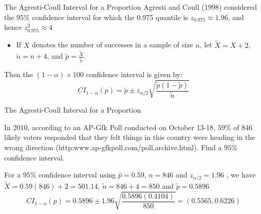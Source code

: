 \documentclass[
  ignorenonframetext,
]{beamer}
\providecommand{\tightlist}{%
  \setlength{\itemsep}{0pt}\setlength{\parskip}{0pt}}
\begin{document}
\begin{frame}{The Agresti-Coull Interval for a Proportion}
\protect\hypertarget{the-agresti-coull-interval-for-a-proportion}{}
Agresti and Coull (1998) considered the \(95\%\) confidence interval for
which the 0.975 quantile is \(z_{0.975}\approx1.96\), and hence
\(z^2_{0.975}\approx 4\)

\begin{itemize}
\tightlist
\item
  If \(X\) denotes the number of successes in a sample of size \(n\),
  let \(\tilde{X}=X+2\), \(\tilde{n}=n+4\), and
  \(\tilde{p}=\frac{\tilde{X}}{\tilde{n}}\).
\end{itemize}

Then the \((1-\alpha)\times 100\) confidence interval is given by:
\[CI_{1 - \alpha}(p) = \tilde{p}\pm z_{\alpha/2}\sqrt{\frac{\tilde{p}(1-\tilde{p})}{\tilde{n}}}\]
\end{frame}

\begin{frame}{The Agresti-Coull Interval for a Proportion}
\protect\hypertarget{the-agresti-coull-interval-for-a-proportion-1}{}
\begin{tcolorbox}
In 2010, according to an AP-Gfk Poll conducted on October 13-18, $59\%$ of 846 likely voters responded that they felt things in this country were heading in the wrong direction (http:www.ap-gfkpoll.com/poll.archive.html). Find a $95\%$ confidence interval. 
\end{tcolorbox}

\begin{tcolorbox}
For a $95\%$ confidence interval using $\hat{p}=0.59$, $n=846$ and $z_{\alpha/2}=1.96$ , we have $\tilde{X}=0.59(846)+2=501.14$, $\tilde{n}=846+4=850$ and $\tilde{p}=0.5896$
$$CI_{1 - \alpha}(p)=0.5896\pm 1.96\sqrt{\frac{0.5896(0.4104)}{850}}=(0.5565,0.6226)$$
\end{tcolorbox}
\end{frame}
\end{document}
